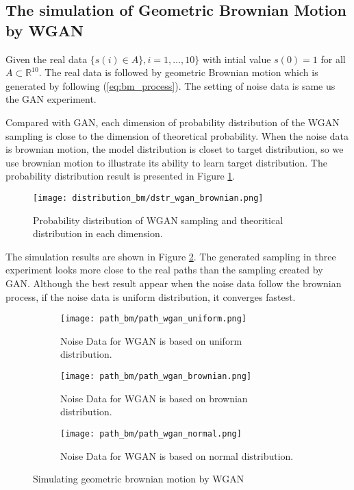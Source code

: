 \documentclass{article}
\begin{document}
	

	\subsection{The simulation of Geometric Brownian Motion by WGAN} 
	
	Given the real data $\{ s(i)\in A \}, i = 1, \dots, 10\}$ with intial  value $s(0)=1$ for all $A \subset \mathbb{R}^{10}$.
	The real data is followed by geometric Brownian motion which is generated by following (\ref{eq:bm_process}).
	The setting of noise data is same us the GAN experiment. 
	
	Compared with GAN, each dimension of probability distribution of the WGAN sampling is close to the dimension of theoretical probability. 
	When the noise data is brownian motion, the model distribution is closet to target distribution, so we use brownian motion to illustrate its ability to learn target distribution.
	The probability distribution result is presented in Figure \ref{fig:dstr_wgan_brownian}.
	
	\begin{figure}[h]
		\centering
		\texttt{[image: distribution\_bm/dstr\_wgan\_brownian.png]}
		\caption{Probability distribution of WGAN sampling and theoritical distribution in each dimension.}
		\label{fig:dstr_wgan_brownian}
	\end{figure}
	
	
	
	
	The simulation results are shown in Figure \ref{fig:path_wgan_bm}. 
	The generated sampling in three experiment looks more close to the real paths than the sampling created by GAN.
	Although the best result appear when the noise data follow the brownian process, if the noise data is uniform distribution, it converges fastest. 
	
	\begin{figure}[h]
		\centering
		\begin{subfigure}[b]{0.6\textwidth}
			\texttt{[image: path\_bm/path\_wgan\_uniform.png]}
			\caption{Noise Data for WGAN is based on uniform distribution.}
		\end{subfigure}
		\begin{subfigure}[b]{0.6\textwidth}
			\texttt{[image: path\_bm/path\_wgan\_brownian.png]}
			\caption{Noise Data for WGAN is based on brownian distribution.}
		\end{subfigure}
		\begin{subfigure}[b]{0.6\textwidth}
			\texttt{[image: path\_bm/path\_wgan\_normal.png]}
			\caption{Noise Data for WGAN is based on normal distribution.}
		\end{subfigure}
		\caption{Simulating geometric brownian motion by WGAN}
		\label{fig:path_wgan_bm}
	\end{figure}
	
\end{document}
